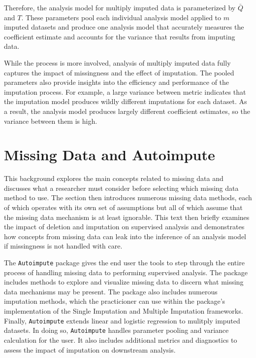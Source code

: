 \documentclass[12pt,oneside]{chicagocapstone}
\begin{document}
Therefore, the analysis model for multiply imputed data is parameterized
by \(\bar Q\) and \(T\). These parameters pool each individual analysis
model applied to \(m\) imputed datasets and produce one analysis model
that accurately measures the coefficient estimate and accounts for the
variance that results from imputing data.

While the process is more involved, analysis of multiply imputed data
fully captures the impact of missingness and the effect of imputation.
The pooled parameters also provide insights into the efficiency and
performance of the imputation process. For example, a large variance
between metric indicates that the imputation model produces wildly
different imputations for each dataset. As a result, the analysis model
produces largely different coefficient estimates, so the variance
between them is high.

\section*{Missing Data and
Autoimpute}\label{background-missing-data-autoimpute}

This background explores the main concepts related to missing data and
discusses what a researcher must consider before selecting which missing
data method to use. The section then introduces numerous missing data
methods, each of which operates with its own set of assumptions but all
of which assume that the missing data mechanism is at least ignorable.
This text then briefly examines the impact of deletion and imputation on
supervised analysis and demonstrates how concepts from missing data can
leak into the inference of an analysis model if missingness is not
handled with care.

The \texttt{Autoimpute} package gives the end user the tools to step
through the entire process of handling missing data to performing
supervised analysis. The package includes methods to explore and
visualize missing data to discern what missing data mechanisms may be
present. The package also includes numerous imputation methods, which
the practicioner can use within the package's implementation of the
Single Imputation and Multiple Imputation frameworks. Finally,
\texttt{Autoimpute} extends linear and logistic regression to mulitply
imputed datasets. In doing so, \texttt{Autoimpute} handles parameter
pooling and variance calculation for the user. It also includes
additional metrics and diagnostics to assess the impact of imputation on
downstream analysis.
\end{document}
